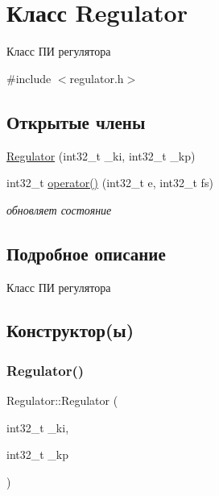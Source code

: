 \hypertarget{classRegulator}{}\section{Класс Regulator}
\label{classRegulator}


Класс ПИ регулятора  




{\ttfamily \#include $<$regulator.\+h$>$}

\subsection*{Открытые члены}
\begin{DoxyCompactItemize}
\item 
\hyperlink{classRegulator_a5e0dcb7d86f99631d5e64c9def236e12}{Regulator} (int32\+\_\+t \+\_\+ki, int32\+\_\+t \+\_\+kp)
\item 
int32\+\_\+t \hyperlink{classRegulator_a7b288e46cae0665700bf7ff4772c573c}{operator()} (int32\+\_\+t e, int32\+\_\+t fs)
\begin{DoxyCompactList}\small\item\em обновляет состояние \end{DoxyCompactList}\end{DoxyCompactItemize}


\subsection{Подробное описание}
Класс ПИ регулятора 

\subsection{Конструктор(ы)}
\mbox{\label{classRegulator_a5e0dcb7d86f99631d5e64c9def236e12}} 
\subsubsection{\texorpdfstring{Regulator()}{Regulator()}}
{\footnotesize\ttfamily Regulator\+::\+Regulator (\begin{DoxyParamCaption}\item[{int32\+\_\+t}]{\+\_\+ki,  }\item[{int32\+\_\+t}]{\+\_\+kp }\end{DoxyParamCaption})\hspace{0.3cm}{\ttfamily [inline]}}


